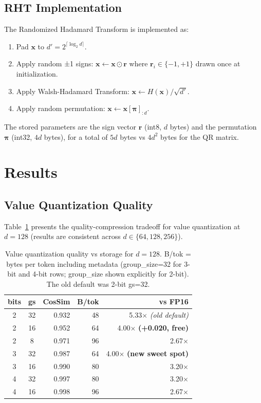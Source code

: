 \documentclass[10pt,twocolumn]{article}
\newcommand{\bm}[1]{\boldsymbol{#1}}
\begin{document}
\subsection{RHT Implementation}

The Randomized Hadamard Transform is implemented as:
\begin{enumerate}
\item Pad $\bm{x}$ to $d' = 2^{\lceil \log_2 d \rceil}$.
\item Apply random ±1 signs: $\bm{x} \leftarrow \bm{x} \odot \bm{r}$ where $\bm{r}_i \in \{-1, +1\}$ drawn once at initialization.
\item Apply Walsh-Hadamard Transform: $\bm{x} \leftarrow H(\bm{x}) / \sqrt{d'}$.
\item Apply random permutation: $\bm{x} \leftarrow \bm{x}[\bm{\pi}]_{:d}$.
\end{enumerate}

The stored parameters are the sign vector $\bm{r}$ (int8, $d$ bytes) and the permutation $\bm{\pi}$ (int32, $4d$ bytes), for a total of $5d$ bytes vs $4d^2$ bytes for the QR matrix.

\section{Results}
\label{sec:results}

\subsection{Value Quantization Quality}
\label{sec:value_quant}

Table~\ref{tab:value_quant} presents the quality-compression tradeoff for value quantization at $d = 128$ (results are consistent across $d \in \{64, 128, 256\}$).

\begin{table}[ht]
\centering
\caption{Value quantization quality vs storage for $d=128$. B/tok = bytes per token including metadata (group\_size=32 for 3-bit and 4-bit rows; group\_size shown explicitly for 2-bit). The old default was 2-bit gs=32.}
\label{tab:value_quant}
\begin{tabular}{ccrrr}
\toprule
\textbf{bits} & \textbf{gs} & \textbf{CosSim} & \textbf{B/tok} & \textbf{vs FP16} \\
\midrule
2 & 32 & 0.932 & 48 & 5.33$\times$ \quad \textit{(old default)} \\
2 & 16 & 0.952 & 64 & 4.00$\times$ \quad \textbf{(+0.020, free)} \\
2 & 8  & 0.971 & 96 & 2.67$\times$ \\
\midrule
3 & 32 & 0.987 & 64 & 4.00$\times$ \quad \textbf{(new sweet spot)} \\
3 & 16 & 0.990 & 80 & 3.20$\times$ \\
\midrule
4 & 32 & 0.997 & 80 & 3.20$\times$ \\
4 & 16 & 0.998 & 96 & 2.67$\times$ \\
\bottomrule
\end{tabular}
\end{table}
\end{document}
